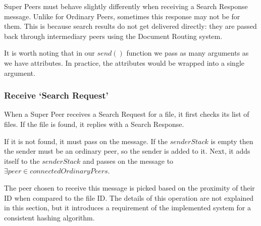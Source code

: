 Super Peers must behave slightly differently when receiving a Search Response
message. Unlike for Ordinary Peers, sometimes this response may not be for them.
This is because search results do not get delivered directly: they are passed
back through intermediary peers using the Document Routing system.

It is worth noting that in our $send()$ function we pass as many arguments as we
have attributes. In practice, the attributes would be wrapped into a single
argument.

\begin{algorithm}[H]

\end{algorithm}

\subsubsection{Receive `Search Request'}


When a Super Peer receives a Search Request for a file, it first checks its list
of files. If the file is found, it replies with a Search Response. 

If it is not found, it must pass on the message. If the $senderStack$ is empty
then the sender must be an ordinary peer, so the sender is added to it.  Next,
it adds itself to the $senderStack$ and passes on the message to $\exists peer
\in connectedOrdinaryPeers$.

The peer chosen to receive this message is picked based on the proximity of
their ID when compared to the file ID.  The details of this operation are not
explained in this section, but it introduces a requirement of the implemented
system for a consistent hashing algorithm.


